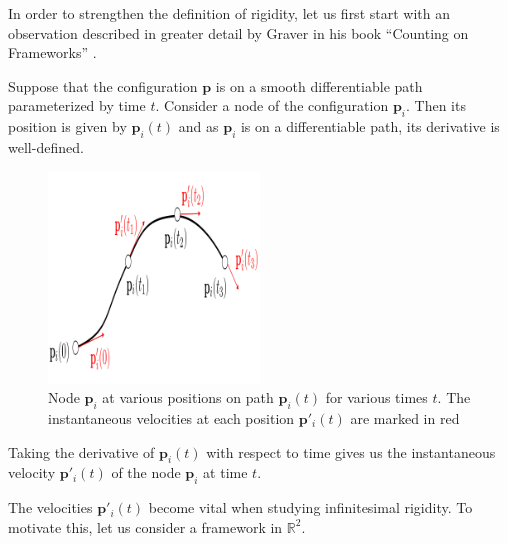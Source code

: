 \begin{flushleft}
In order to strengthen the definition of rigidity, let us first start with an observation described in greater detail by Graver in his book ``Counting on Frameworks'' \cite{counting_frameworks}. 
\end{flushleft}

\begin{flushleft}
Suppose that the configuration $\mathbf{p}$ is on a smooth differentiable path parameterized by time $t$. Consider a node of the configuration $\mathbf{p}_i$. Then its position is given by $\mathbf{p}_i(t)$ and as $\mathbf{p}_i$ is on a differentiable path, its derivative is well-defined.
\end{flushleft}

\begin{figure}[htbp]
    \centering
    \includegraphics[width = 0.5\textwidth]{Chapter 2/12. path.png}
    \caption{Node $\mathbf{p}_i$ at various positions on path $\mathbf{p}_i(t)$ for various times $t$. The instantaneous velocities at each position $\mathbf{p}'_i(t)$ are marked in red}
    \label{fig: path}
\end{figure}

\vspace{-3mm}
\begin{flushleft}
    Taking the derivative of $\mathbf{p}_i(t)$ with respect to time gives us the instantaneous velocity $\mathbf{p}'_i(t)$ of the node $\mathbf{p}_i$ at time $t$.    
\end{flushleft}


\begin{flushleft}
The velocities $\mathbf{p}'_i(t)$ become vital when studying infinitesimal rigidity. To motivate this, let us consider a framework in $\mathbb{R}^2$.
\end{flushleft}

